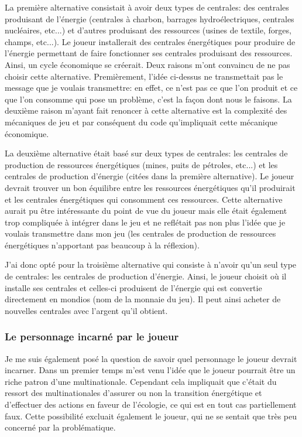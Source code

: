 \documentclass{article}
\begin{document}
        
        La première alternative consistait à avoir deux types de centrales: des centrales produisant de l'énergie (centrales à charbon, barrages hydroélectriques, centrales nucléaires, etc...) et d'autres produisant des ressources (usines de textile, forges, champs, etc...). Le joueur installerait des centrales énergétiques pour produire de l'énergie permettant de faire fonctionner ses centrales produisant des ressources. Ainsi, un cycle économique se créerait. 
        Deux raisons m'ont convaincu de ne pas choisir cette alternative. Premièrement, l'idée ci-dessus ne transmettait pas le message que je voulais transmettre: en effet, ce n'est pas ce que l'on produit et ce que l'on consomme qui pose un problème, c'est la façon dont nous le faisons. La deuxième raison m'ayant fait renoncer à cette alternative est la complexité des mécaniques de jeu et par conséquent du code qu'impliquait cette mécanique économique.
        
        
        La deuxième alternative était basé sur deux types de centrales: les centrales de production de ressources énergétiques (mines, puits de pétroles, etc...) et les centrales de production d'énergie (citées dans la première alternative). Le joueur devrait trouver un bon équilibre entre les ressources énergétiques qu'il produirait et les centrales énergétiques qui consomment ces ressources.
        Cette alternative aurait pu être intéressante du point de vue du joueur mais elle était également trop compliquée à intégrer dans le jeu et ne reflétait pas non plus l'idée que je voulais transmettre dans mon jeu (les centrales de production de ressources énergétiques n'apportant pas beaucoup à la réflexion).
        
        
        J'ai donc opté pour la troisième alternative qui consiste à n'avoir qu'un seul type de centrales: les centrales de production d'énergie. Ainsi, le joueur choisit où il installe ses centrales et celles-ci produisent de l'énergie qui est convertie directement en mondios (nom de la monnaie du jeu). Il peut ainsi acheter de nouvelles centrales avec l'argent qu'il obtient.
        
        \subsubsection{Le personnage incarné par le joueur}
        Je me suis également posé la question de savoir quel personnage le joueur devrait incarner. Dans un premier temps m'est venu l'idée que le joueur pourrait être un riche patron d'une multinationale. Cependant cela impliquait que c'était du ressort des multinationales d'assurer ou non la transition énergétique et d'effectuer des actions en faveur de l'écologie, ce qui est en tout cas partiellement faux. Cette possibilité excluait également le joueur, qui ne se sentait que très peu concerné par la problématique.
        
\end{document}
